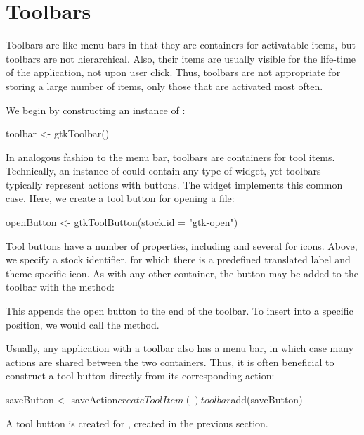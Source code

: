 \section{Toolbars}
\label{sec:RGtk2:toolbars}

Toolbars are like menu bars in that they are containers for
activatable items, but toolbars are not hierarchical. Also, their
items are usually visible for the life-time of the application, not
upon user click. Thus, toolbars are not appropriate for storing a
large number of items, only those that are activated most often.

We begin by constructing an instance of :
\begin{Schunk}
\begin{Sinput}
 toolbar <- gtkToolbar()
\end{Sinput}
\end{Schunk}

In analogous fashion to the menu bar, toolbars are containers for tool
items. Technically, an instance of  could contain
any type of widget, yet toolbars typically represent actions
with buttons. The  widget implements this common
case.  Here, we create a tool button for opening a file:
\begin{Schunk}
\begin{Sinput}
 openButton <- gtkToolButton(stock.id = "gtk-open") 
\end{Sinput}
\end{Schunk}
%
Tool buttons have a number of properties, including  and
several for icons. Above, we specify a stock identifier,
for which there is a predefined translated label and theme-specific icon.
As with any other container, the button may be added to the toolbar with
the  method:
\begin{Schunk}
\end{Schunk}
%
This appends the open button to the end of the toolbar. To insert into
a specific position, we would call the  method.

Usually, any application with a toolbar also has a menu bar, in which
case many actions are shared between the two containers. Thus, it is
often beneficial to construct a tool button directly from its
corresponding action:
\begin{Schunk}
\begin{Sinput}
 saveButton <- saveAction$createToolItem()
 toolbar$add(saveButton)
\end{Sinput}
\end{Schunk}
%
A tool button is created for , created in the
previous section.

